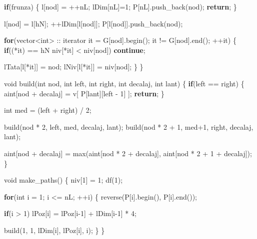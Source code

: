 \documentclass[10pt,]{article}
\newenvironment{Shaded}{}{}
\newcommand{\KeywordTok}[1]{\textcolor[rgb]{0.00,0.44,0.13}{\textbf{{#1}}}}
\newcommand{\DataTypeTok}[1]{\textcolor[rgb]{0.56,0.13,0.00}{{#1}}}
\newcommand{\DecValTok}[1]{\textcolor[rgb]{0.25,0.63,0.44}{{#1}}}
\newcommand{\NormalTok}[1]{{#1}}
\begin{document}
\begin{Shaded}
\begin{Highlighting}[]
{{{{  \KeywordTok{if}\NormalTok{(frunza) \{}
    \NormalTok{l[nod] = ++nL;}
    \NormalTok{lDim[nL]=}\DecValTok{1}\NormalTok{;}
    \NormalTok{P[nL].push_back(nod);}
    \KeywordTok{return}\NormalTok{;}
  \NormalTok{\}}

  \NormalTok{l[nod] = l[hN];}
  \NormalTok{++lDim[l[nod]];}
  \NormalTok{P[l[nod]].push_back(nod);}

  \KeywordTok{for}\NormalTok{(vector<}\DataTypeTok{int}\NormalTok{> :: iterator it = G[nod].begin(); it != G[nod].end(); ++it) \{}
    \KeywordTok{if}\NormalTok{((*it) == hN \textbar{}\textbar{} niv[*it] < niv[nod])}
      \KeywordTok{continue}\NormalTok{;}

    \NormalTok{lTata[l[*it]] = nod;}
    \NormalTok{lNiv[l[*it]] = niv[nod];}
  \NormalTok{\}}
\NormalTok{\}}

\DataTypeTok{void} \NormalTok{build(}\DataTypeTok{int} \NormalTok{nod, }\DataTypeTok{int} \NormalTok{left, }\DataTypeTok{int} \NormalTok{right, }\DataTypeTok{int} \NormalTok{decalaj, }\DataTypeTok{int} \NormalTok{lant)}
\NormalTok{\{}
  \KeywordTok{if}\NormalTok{(left == right) \{}
    \NormalTok{aint[nod + decalaj] = v[ P[lant][left - }\DecValTok{1}\NormalTok{] ];}
    \KeywordTok{return}\NormalTok{;}
  \NormalTok{\}}

  \DataTypeTok{int} \NormalTok{med = (left + right) / }\DecValTok{2}\NormalTok{;}

  \NormalTok{build(nod * }\DecValTok{2}\NormalTok{, left, med, decalaj, lant);}
  \NormalTok{build(nod * }\DecValTok{2} \NormalTok{+ }\DecValTok{1}\NormalTok{, med}\DecValTok{+1}\NormalTok{, right, decalaj, lant);}

  \NormalTok{aint[nod + decalaj] = max(aint[nod * }\DecValTok{2} \NormalTok{+ decalaj], aint[nod * }\DecValTok{2} \NormalTok{+ }\DecValTok{1} \NormalTok{+ decalaj]);}
\NormalTok{\}}

\DataTypeTok{void} \NormalTok{make_paths()}
\NormalTok{\{}
  \NormalTok{niv[}\DecValTok{1}\NormalTok{] = }\DecValTok{1}\NormalTok{;}
  \NormalTok{df(}\DecValTok{1}\NormalTok{);}

  \KeywordTok{for}\NormalTok{(}\DataTypeTok{int} \NormalTok{i = }\DecValTok{1}\NormalTok{; i <= nL; ++i) \{}
    \NormalTok{reverse(P[i].begin(), P[i].end());}

    \KeywordTok{if}\NormalTok{(i > }\DecValTok{1}\NormalTok{)}
      \NormalTok{lPoz[i] = lPoz[i}\DecValTok{-1}\NormalTok{] + lDim[i}\DecValTok{-1}\NormalTok{] * }\DecValTok{4}\NormalTok{;}

    \NormalTok{build(}\DecValTok{1}\NormalTok{, }\DecValTok{1}\NormalTok{, lDim[i], lPoz[i], i);}
  \NormalTok{\}}
\NormalTok{\}}

}}}}
\end{Highlighting}
\end{Shaded}
\end{document}
